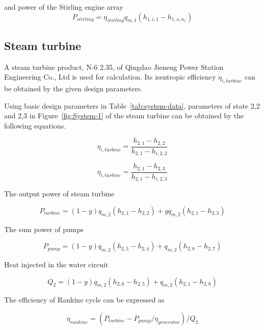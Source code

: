 \documentclass{article}
\begin{document}
and power of the Stirling engine array
\begin{equation*}
	P_{stirling}=\eta_{stirling}q_{m,1}(h_{1,i,1}-h_{1,o,n_{1}})
\end{equation*}

\subsection{Steam turbine}

A steam turbine product, N-6 2.35, of Qingdao Jieneng Power Station Engineering Co., Ltd is used for calculation. Its isentropic efficiency $\eta_{i,turbine}$ can be obtained by the given design parameters.

Using basic design parameters in Table~\ref{tab:system-data}, parameters of state 2,2 and 2,3 in Figure~\ref{fig:System-1} of the steam turbine can be obtained by the following equations.

\begin{equation*}
	\eta_{i,turbine}=\frac{h_{2,1}-h_{2,2}}{h_{2,1}-h_{i,2,2}}
\end{equation*}

\begin{equation*}
	\eta_{i,turbine}=\frac{h_{2,1}-h_{2,3}}{h_{2,1}-h_{i,2,3}}
\end{equation*}

The output power of steam turbine

\begin{equation*}
	P_{turbine}=\left(1-y\right)q_{m,2}\left(h_{2,1}-h_{2,2}\right)+yq_{m,2}\left(h_{2,1}-h_{2,3}\right)
\end{equation*}

The sum power of pumps

\begin{equation*}
	P_{pump}=\left(1-y\right)q_{m,2}\left(h_{2,5}-h_{2,4}\right)+q_{m,2}\left(h_{2,8}-h_{2,7}\right)
\end{equation*}

Heat injected in the water circuit

\begin{equation*}
	Q_2=\left(1-y\right)q_{m,2}\left(h_{2,6}-h_{2,5}\right)+q_{m,2}\left(h_{2,1}-h_{2,8}\right)
\end{equation*}

The efficiency of Rankine cycle can be expressed as

\begin{equation*}
	\eta_{rankine}=(P_{turbine}-P_{pump}/\eta_{generator})/Q_{2}
\end{equation*}
\end{document}
